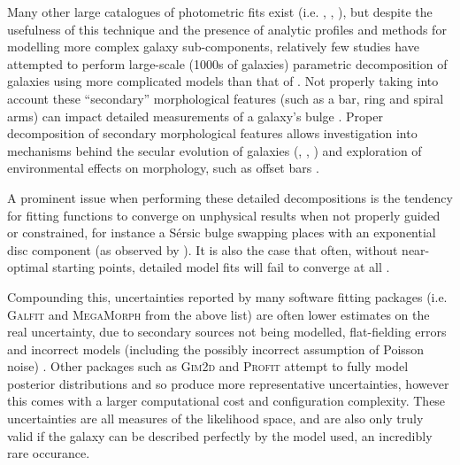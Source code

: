 \documentclass[../main.tex]{subfiles}
\begin{document}
Many other large catalogues of photometric fits exist (i.e. \citealt{2012MNRAS.421.2277L}, \citealt{2012MNRAS.421.1007K}, \citealt{2012ApJS..203...24V}), but despite the usefulness of this technique and the presence of analytic profiles and methods for modelling more complex galaxy sub-components, relatively few studies have attempted to perform large-scale (1000s of galaxies) parametric decomposition of galaxies using more complicated models than that of \citet{2011ApJS..196...11S}. Not properly taking into account these ``secondary'' morphological features (such as a bar, ring and spiral arms) can impact detailed measurements of a galaxy's bulge \citep{Gao2017:1709.00746v1}. Proper decomposition of secondary morphological features allows investigation into mechanisms behind the secular evolution of galaxies (\citealt{2015MNRAS.453.3729H}, \citealt{2018MNRAS.473.4731K}, \citealt{2018ApJ...862..100G}) and exploration of environmental effects on morphology, such as offset bars \citep{2017MNRAS.469.3363K}.

A prominent issue when performing these detailed decompositions is the tendency for fitting functions to converge on unphysical results when not properly guided or constrained, for instance a S\'ersic bulge swapping places with an exponential disc component (as observed by \citealt{2018MNRAS.473.4731K}). It is also the case that often, without near-optimal starting points, detailed model fits will fail to converge at all \citep{2016MNRAS.462.1470L}.

Compounding this, uncertainties reported by many software fitting packages (i.e. \textsc{Galfit} and \textsc{MegaMorph} from the above list) are often lower estimates on the real uncertainty, due to secondary sources not being modelled, flat-fielding errors and incorrect models (including the possibly incorrect assumption of Poisson noise) \citep{2010AJ....139.2097P}. Other packages such as \textsc{Gim2d} and \textsc{Profit} attempt to fully model posterior distributions and so produce more representative uncertainties, however this comes with a larger computational cost and configuration complexity. These uncertainties are all measures of the likelihood space, and are also only truly valid if the galaxy can be described perfectly by the model used, an incredibly rare occurance.
\end{document}

